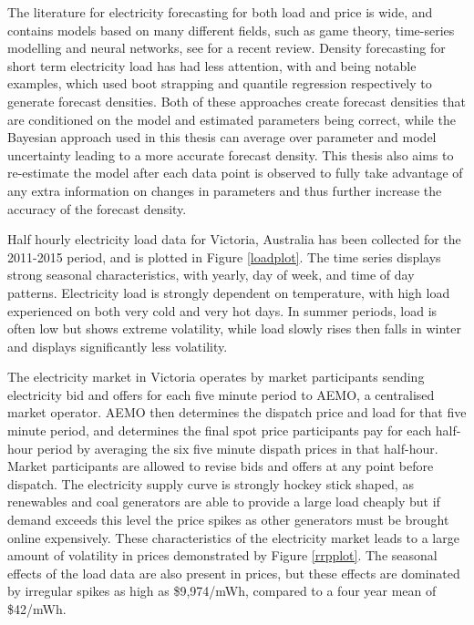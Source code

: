 \documentclass[12pt,a4paper]{article}%
\numberwithin{equation}{section}
\begin{document}
The literature for electricity forecasting for both load and price is wide, and contains models based on many different fields, such as game theory, time-series modelling and neural networks, see \citet{Weron2014} for a recent review. Density forecasting for short term electricity load has had less attention, with \citet{Fan2012} and \citet{He2016} being notable examples, which used boot strapping and quantile regression respectively to generate forecast densities. Both of these approaches create forecast densities that are conditioned on the model and estimated parameters being correct, while the Bayesian approach used in this thesis can average over parameter and model uncertainty leading to a more accurate forecast density. This thesis also aims to re-estimate the model after each data point is observed to fully take advantage of any extra information on changes in parameters and thus further increase the accuracy of the forecast density. 

Half hourly electricity load data for Victoria, Australia has been collected for the 2011-2015 period, and is plotted in Figure \ref{loadplot}. The time series displays strong seasonal characteristics, with yearly, day of week, and time of day patterns. Electricity load is strongly dependent on temperature, with high load experienced on both very cold and very hot days. In summer periods, load is often low but shows extreme volatility, while load slowly rises then falls in winter and displays significantly less volatility. 

The electricity market in Victoria operates by market participants sending electricity bid and offers for each five minute period to  AEMO, a centralised market operator. AEMO then determines the dispatch price and load for that five minute period, and determines the final spot price participants pay for each half-hour period by averaging the six five minute dispath prices in that half-hour. Market participants are allowed to revise bids and offers at any point before dispatch. The electricity supply curve is strongly hockey stick shaped, as renewables and coal generators are able to provide a large load cheaply but if demand exceeds this level the price spikes as other generators must be brought online expensively. These characteristics of the electricity market leads to a large amount of volatility in prices demonstrated by Figure \ref{rrpplot}. The seasonal effects of the load data are also present in prices, but these effects are dominated by irregular spikes as high as \$9,974/mWh, compared to a four year mean of \$42/mWh.
\end{document}
